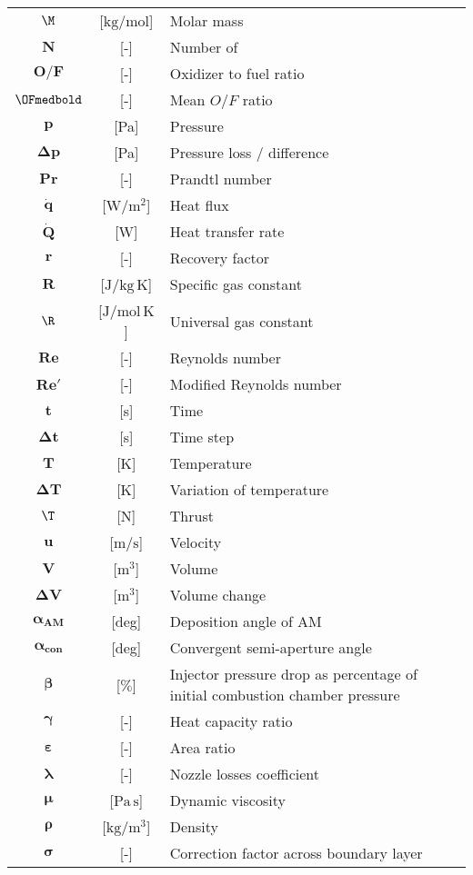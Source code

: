 \begin{multicols}{2}
{\begin{xltabular}{\linewidth}{cc>{\raggedright\arraybackslash}X}
		$\boldsymbol{\M}$ & [$\textrm{kg} / \textrm{mol}$] & Molar mass \\
		$\boldsymbol{N}$ & [-] & Number of \\
		$\boldsymbol{O/F}$ & [-] & Oxidizer to fuel ratio \\
		$\OFmedbold$ & [-] & Mean $O/F$ ratio \\ 
		$\boldsymbol{p}$ & [Pa] & Pressure \\
		$\boldsymbol{\Delta p}$ & [Pa] & Pressure loss / difference \\
		$\boldsymbol{Pr}$ & [-] & Prandtl number \\
		$\boldsymbol{\dot{q}}$ & [$\textrm{W} / \textrm{m}^2$] & Heat flux \\
		$\boldsymbol{\dot{Q}}$ & [W] & Heat transfer rate \\
		$\boldsymbol{r}$ & [-] & Recovery factor \\
		$\boldsymbol{R}$ & [$\textrm{J} / \textrm{kg} \, \textrm{K}$] & Specific gas constant \\
		$\boldsymbol{\R}$ & [$\textrm{J} / \textrm{mol} \, \textrm{K}$] & Universal gas constant \\
		$\boldsymbol{Re}$ & [-] & Reynolds number \\
		$\boldsymbol{Re'}$ & [-] & Modified Reynolds number \\
		$\boldsymbol{t}$ & [s] & Time \\
		$\boldsymbol{\Delta t}$ & [s] & Time step \\
		$\boldsymbol{T}$ & [K] & Temperature \\
		$\boldsymbol{\Delta T}$ & [K] & Variation of temperature \\
		$\boldsymbol{\T}$ & [N] & Thrust \\
		$\boldsymbol{u}$ & [$\textrm{m} / \textrm{s}$] & Velocity \\
		$\boldsymbol{V}$ & [$\textrm{m}^3$] & Volume \\
		$\boldsymbol{\Delta V}$ & [$\textrm{m}^3$] & Volume change \\
		$\boldsymbol{\alpha_{AM}}$ & [deg] & Deposition angle of AM \\
		$\boldsymbol{\alpha_{con}}$ & [deg] & Convergent semi-aperture angle \\
		$\boldsymbol{\beta}$ & [$\%$] & Injector pressure drop as percentage of initial combustion chamber pressure \\ 
		$\boldsymbol{\gamma}$ & [-] & Heat capacity ratio \\
		$\boldsymbol{\varepsilon}$ & [-] & Area ratio \\
		$\boldsymbol{\lambda}$ & [-] & Nozzle losses coefficient \\
		$\boldsymbol{\mu}$ & [$\textrm{Pa} \, \textrm{s}$] & Dynamic viscosity \\
		$\boldsymbol{\rho}$ & [$\textrm{kg} / \textrm{m}^3$] & Density \\
		$\boldsymbol{\sigma}$ & [-] & Correction factor across boundary layer \\
	\end{xltabular}
	\unskip
	\unpenalty
	\unpenalty}
	\unvbox\ltmcbox
\end{multicols}

